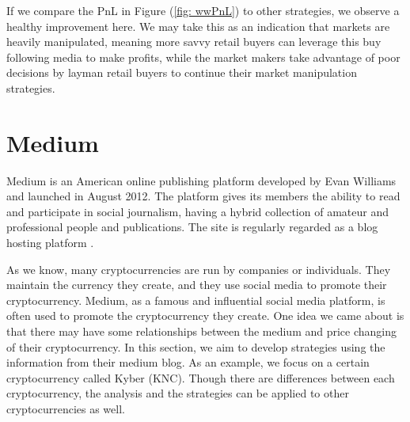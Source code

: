 \documentclass[twoside]{report}
\begin{document}
\begin{spacing}{1}
If we compare the PnL in Figure (\ref{fig: wwPnL}) to other strategies, we observe a healthy improvement here. We may take this as an indication that markets are heavily manipulated, meaning more savvy retail buyers can leverage this buy following media to make profits, while the market makers take advantage of poor decisions by layman retail buyers to continue their market manipulation strategies.

\section{Medium}\label{sec:medium}
Medium is an American online publishing platform developed by Evan Williams and launched in August 2012. The platform gives its members the ability to read and participate in social journalism, having a hybrid collection of amateur and professional people and publications. The site is regularly regarded as a blog hosting platform \cite{streitfeld2017internet}.




As we know, many cryptocurrencies are run by companies or individuals. They maintain the currency they create, and they use social media to promote their cryptocurrency. Medium, as a famous and influential social media platform, is often used to promote the cryptocurrency they create. One idea we came about is that there may have some relationships between the medium and price changing of their cryptocurrency. In this section, we aim to develop strategies using the information from their medium blog. As an example, we focus on a certain cryptocurrency called Kyber (KNC). Though there are differences between each cryptocurrency, the analysis and the strategies can be applied to other cryptocurrencies as well. 




\end{spacing}
\end{document}
